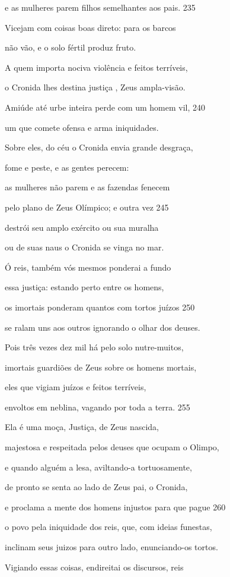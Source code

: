 e as mulheres parem filhos semelhantes aos pais. \num{235}

Vicejam com coisas boas direto: para os barcos

não vão, e o solo fértil produz fruto.

A quem importa nociva violência e feitos terríveis,

o Cronida lhes destina justiça , Zeus ampla-visão.

Amiúde até urbe inteira perde com um homem vil, \num{240}

um que comete ofensa e arma iniquidades.

Sobre eles, do céu o Cronida envia grande desgraça,

fome e peste, e as gentes perecem:

as mulheres não parem e as fazendas fenecem

pelo plano de Zeus Olímpico; e outra vez \num{245}

destrói seu amplo exército ou sua muralha

ou de suas naus o Cronida se vinga no mar.

Ó reis, também vós mesmos ponderai a fundo

essa justiça: estando perto entre os homens,

os imortais ponderam quantos com tortos juízos \num{250}

se ralam uns aos outros ignorando o olhar dos deuses.

Pois três vezes dez mil há pelo solo nutre-muitos,

imortais guardiões de Zeus sobre os homens mortais,

eles que vigiam juízos e feitos terríveis,

envoltos em neblina, vagando por toda a terra. \num{255}

Ela é uma moça, Justiça, de Zeus nascida,

majestosa e respeitada pelos deuses que ocupam o Olimpo,

e quando alguém a lesa, aviltando-a tortuosamente,

de pronto se senta ao lado de Zeus pai, o Cronida,

e proclama a mente dos homens injustos para que pague \num{260}

o povo pela iniquidade dos reis, que, com ideias funestas,

inclinam seus juizos para outro lado, enunciando-os tortos.

Vigiando essas coisas, endireitai os discursos, reis

